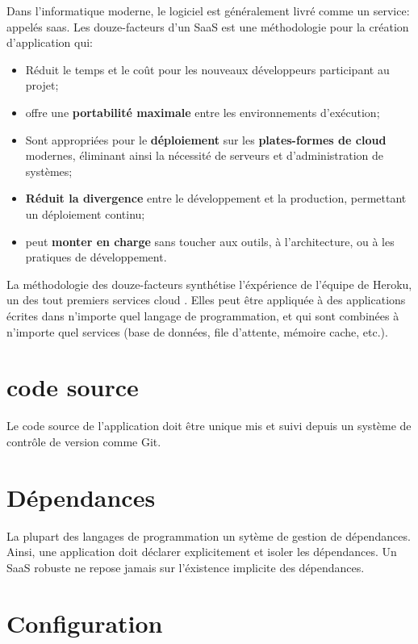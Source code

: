 Dans l'informatique moderne, le logiciel est généralement livré comme un service: appelés \acrshort{saas}. Les douze-facteurs d'un SaaS est une méthodologie pour la création d'application qui:

\begin{itemize}
	\item Réduit le temps et le coût pour les nouveaux développeurs participant au projet;
	\item offre une \textbf{portabilité maximale} entre les environnements d'exécution;
	\item Sont appropriées pour le \textbf{déploiement} sur les \textbf{plates-formes de cloud} modernes, éliminant ainsi la nécessité de serveurs et d'administration de systèmes;
	\item \textbf{Réduit la divergence} entre le développement et la production, permettant un déploiement continu;
	\item peut \textbf{monter en charge} sans toucher aux outils, à l'architecture, ou à les pratiques de développement.
\end{itemize}


La méthodologie des douze-facteurs synthétise l'éxpérience de l'équipe de Heroku, un des tout premiers services cloud \cite{12-factors}. Elles peut être appliquée à des applications écrites dans n'importe quel langage de programmation, et qui sont combinées à n'importe quel services (base de données, file d'attente, mémoire cache, etc.).


\section*{code source}

Le code source de l'application doit être unique mis et suivi depuis un système de contrôle de version comme Git.

\section*{Dépendances}

La plupart des langages de programmation un sytème de gestion de dépendances. Ainsi, une application doit déclarer explicitement et isoler les dépendances. Un SaaS robuste ne repose jamais sur l'éxistence implicite des dépendances. 

\section*{Configuration}

